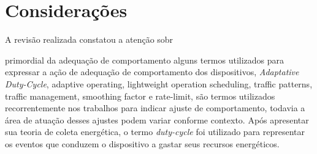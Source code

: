 \section{Considerações}

A revisão realizada constatou a atenção sobr



 primordial da adequação de comportamento alguns termos utilizados para expressar a ação de adequação de comportamento dos dispositivos, \textit{Adaptative Duty-Cycle}, 
adaptive operating,
lightweight operation scheduling,
traffic patterns,
traffic management,
smoothing factor e
rate-limit, são termos utilizados recorrentemente nos trabalhos para indicar ajuste de comportamento, todavia a área de atuação desses ajustes podem variar conforme contexto. Após  apresentar sua teoria de coleta energética, o termo \textit{duty-cycle} foi utilizado para representar os eventos que conduzem o dispositivo a gastar seus recursos energéticos.


